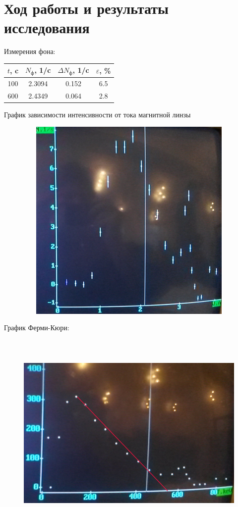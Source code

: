 \documentclass[12pt]{article}
\begin{document}
\section*{Ход работы и результаты исследования}
\par
	Измерения фона:
\begin{table}[h!]
	\centering
	\begin{tabular}{|c|c|c|c|}
	\hline
		$t$, c & $N_\text{ф}$, 1/c & $\Delta N_\text{ф}$, 1/c & $\varepsilon$, \% \\
	\hline
		100 & 2.3094 & 0.152 & 6.5 \\
	\hline
		600 & 2.4349 & 0.064 & 2.8 \\ 
	\hline
	\end{tabular}
\end{table}
\par
	График зависимости интенсивности от тока магнитной линзы
\begin{figure}[h!]
	\centering
	\includegraphics[width = 12cm, height = 10cm]{first_graph.jpg}
\end{figure}
\newpage
\par
	График Ферми-Кюри:
\begin{figure}[h!]
	\centering
	\includegraphics[width = 12cm, height = 10cm]{energy.png}
\end{figure}
\end{document}
